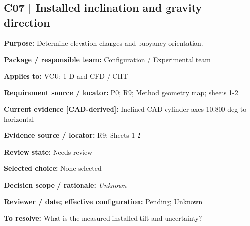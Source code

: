 \documentclass[11pt]{article}
\begin{document}
\par\noindent\begin{minipage}{\textwidth}\small\setlength{\parskip}{2pt}
\subsection*{C07 | Installed inclination and gravity direction}
\textbf{Purpose:} Determine elevation changes and buoyancy orientation.\par
\textbf{Package / responsible team:} Configuration / Experimental team\par
\textbf{Applies to:} VCU; 1-D and CFD / CHT\par
\textbf{Requirement source / locator:} P0; R9; Method geometry map; sheets 1-2\par
\textbf{Current evidence [CAD-derived]:} Inclined CAD cylinder axes 10.800 deg to horizontal\par
\textbf{Evidence source / locator:} R9; Sheets 1-2\par
\textbf{Review state:} Needs review\par
\textbf{Selected choice:} None selected\par
\textbf{Decision scope / rationale:} \textit{Unknown}\par
\textbf{Reviewer / date; effective configuration:} Pending; Unknown\par
\textbf{To resolve:} What is the measured installed tilt and uncertainty?\par
\end{minipage}\par\vspace{5pt}
\end{document}
